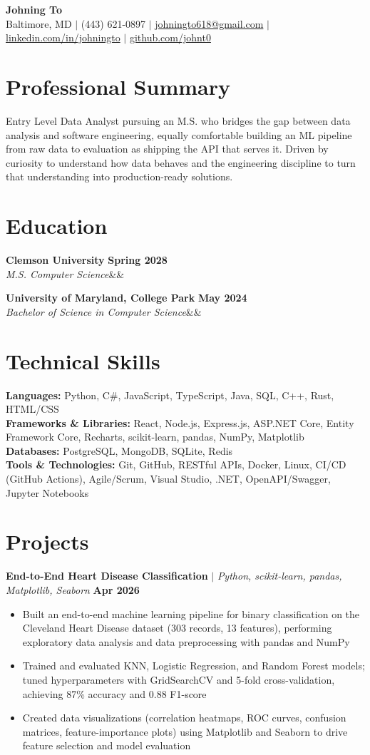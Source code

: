 \documentclass[11pt,letterpaper]{article}
\makeatletter
\newcommand{\name}{Johning To}
\newcommand{\phone}{(443) 621-0897}
\newcommand{\email}{johningto618@gmail.com}
\newcommand{\linkedin}{linkedin.com/in/johningto}
\newcommand{\github}{github.com/johnt0}
\newcommand{\location}{Baltimore, MD}
\newcommand{\summary}{Entry Level Data Analyst pursuing an M.S. who bridges the gap between data analysis and software engineering, equally comfortable building an ML pipeline from raw data to evaluation as shipping the API that serves it. Driven by curiosity to understand how data behaves and the engineering discipline to turn that understanding into production-ready solutions.}
\newcommand{\languages}{Python, C\#, JavaScript, TypeScript, Java, SQL, C++, Rust, HTML/CSS}
\newcommand{\frameworks}{React, Node.js, Express.js, ASP.NET Core, Entity Framework Core, Recharts, scikit-learn, pandas, NumPy, Matplotlib}
\newcommand{\databases}{PostgreSQL, MongoDB, SQLite, Redis}
\newcommand{\toolstech}{Git, GitHub, RESTful APIs, Docker, Linux, CI/CD (GitHub Actions), Agile/Scrum, Visual Studio, .NET, OpenAPI/Swagger, Jupyter Notebooks}
\newcommand{\education}[4]{%
    \noindent\textbf{#1} \hfill \textbf{#2}\\
    \textit{#3}\ifx&#4&\else\hfill #4\fi\par
}
\newcommand{\project}[3]{
    \noindent\textbf{#1} $\mid$ \textit{#2} \hfill \textbf{#3}
}
\makeatother
\begin{document}
\begin{center}
    {\Huge \textbf{\name}}\\
    \location{} $\mid$ \phone{} $\mid$
    \href{mailto:\email}{\email} $\mid$
    \href{https://\linkedin}{\linkedin} $\mid$
    \href{https://\github}{\github}
\end{center}

\section{Professional Summary}
\summary

\section{Education}
\education{Clemson University}{Spring 2028}{M.S. Computer Science}{}
\vspace{2pt}
\education{University of Maryland, College Park}{May 2024}{Bachelor of Science in Computer Science}{}

\section{Technical Skills}
\textbf{Languages:} \languages\\
\textbf{Frameworks \& Libraries:} \frameworks\\
\textbf{Databases:} \databases\\
\textbf{Tools \& Technologies:} \toolstech

\section{Projects}

\project{End-to-End Heart Disease Classification}{Python, scikit-learn, pandas, Matplotlib, Seaborn}{Apr 2026}
\begin{itemize}
    \item Built an end-to-end machine learning pipeline for binary classification on the Cleveland Heart Disease dataset (303 records, 13 features), performing exploratory data analysis and data preprocessing with pandas and NumPy
    \item Trained and evaluated KNN, Logistic Regression, and Random Forest models; tuned hyperparameters with GridSearchCV and 5-fold cross-validation, achieving 87\% accuracy and 0.88 F1-score
    \item Created data visualizations (correlation heatmaps, ROC curves, confusion matrices, feature-importance plots) using Matplotlib and Seaborn to drive feature selection and model evaluation
\end{itemize}
\end{document}
